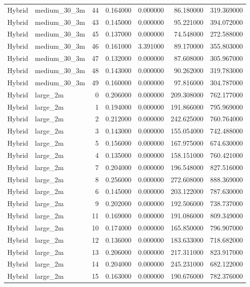 \begin{tabular}{llrrrrr}
Hybrid & medium_30_3m & 44 & 0.164000 & 0.000000 & 86.180000 & 319.369000 \\
Hybrid & medium_30_3m & 43 & 0.145000 & 0.000000 & 95.221000 & 394.072000 \\
Hybrid & medium_30_3m & 45 & 0.137000 & 0.000000 & 74.548000 & 272.588000 \\
Hybrid & medium_30_3m & 46 & 0.161000 & 3.391000 & 89.170000 & 355.803000 \\
Hybrid & medium_30_3m & 47 & 0.132000 & 0.000000 & 87.608000 & 305.967000 \\
Hybrid & medium_30_3m & 48 & 0.143000 & 0.000000 & 90.262000 & 319.783000 \\
Hybrid & medium_30_3m & 49 & 0.160000 & 0.000000 & 97.816000 & 304.787000 \\
Hybrid & large_2m & 0 & 0.206000 & 0.000000 & 209.308000 & 762.177000 \\
Hybrid & large_2m & 1 & 0.194000 & 0.000000 & 191.866000 & 795.969000 \\
Hybrid & large_2m & 2 & 0.212000 & 0.000000 & 242.625000 & 760.764000 \\
Hybrid & large_2m & 3 & 0.143000 & 0.000000 & 155.054000 & 742.488000 \\
Hybrid & large_2m & 5 & 0.156000 & 0.000000 & 167.975000 & 674.630000 \\
Hybrid & large_2m & 4 & 0.135000 & 0.000000 & 158.151000 & 760.421000 \\
Hybrid & large_2m & 7 & 0.204000 & 0.000000 & 196.548000 & 827.516000 \\
Hybrid & large_2m & 8 & 0.256000 & 0.000000 & 272.608000 & 888.369000 \\
Hybrid & large_2m & 6 & 0.145000 & 0.000000 & 203.122000 & 787.630000 \\
Hybrid & large_2m & 9 & 0.202000 & 0.000000 & 192.506000 & 738.737000 \\
Hybrid & large_2m & 11 & 0.169000 & 0.000000 & 191.086000 & 809.349000 \\
Hybrid & large_2m & 10 & 0.174000 & 0.000000 & 165.850000 & 796.907000 \\
Hybrid & large_2m & 12 & 0.136000 & 0.000000 & 183.633000 & 718.682000 \\
Hybrid & large_2m & 13 & 0.206000 & 0.000000 & 217.311000 & 823.917000 \\
Hybrid & large_2m & 14 & 0.204000 & 0.000000 & 245.231000 & 682.122000 \\
Hybrid & large_2m & 15 & 0.163000 & 0.000000 & 190.676000 & 782.376000 \\

\end{tabular}
